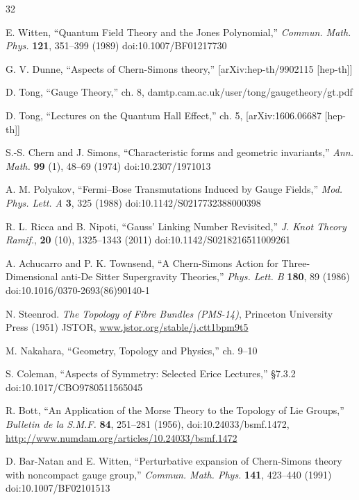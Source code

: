 \documentclass[11pt,a4paper]{article}
\begin{document}
\begin{thebibliography}{32}

 E. Witten, ``Quantum Field Theory and the Jones Polynomial,'' \emph{Commun. Math. Phys.} \textbf{121}, 351--399 (1989) doi:10.1007/BF01217730

 G. V. Dunne, ``Aspects of Chern-Simons theory,'' [arXiv:hep-th/9902115 [hep-th]]

 D. Tong, ``Gauge Theory,'' ch. 8, damtp.cam.ac.uk/user/tong/gaugetheory/gt.pdf

 D. Tong, ``Lectures on the Quantum Hall Effect,'' ch. 5, [arXiv:1606.06687 [hep-th]]

 S.-S. Chern and J. Simons, ``Characteristic forms and geometric invariants,'' \emph{Ann. Math.} \textbf{99} (1), 48--69 (1974) doi:10.2307/1971013

 A. M. Polyakov, ``Fermi--Bose Transmutations Induced by Gauge Fields,'' \emph{Mod. Phys. Lett. A} \textbf{3}, 325 (1988) doi:10.1142/S0217732388000398

 R. L. Ricca and B. Nipoti, ``Gauss' Linking Number Revisited,'' \emph{J. Knot Theory Ramif.}, \textbf{20} (10), 1325--1343 (2011) doi:10.1142/S0218216511009261

 A. Achucarro and P. K. Townsend, ``A Chern-Simons Action for Three-Dimensional anti-De Sitter Supergravity Theories,'' \emph{Phys. Lett. B} \textbf{180}, 89 (1986) doi:10.1016/0370-2693(86)90140-1

 N. Steenrod. \emph{The Topology of Fibre Bundles (PMS-14)}, Princeton University Press (1951) JSTOR, \href{https://www.jstor.org/stable/j.ctt1bpm9t5}{www.jstor.org/stable/j.ctt1bpm9t5}

 M. Nakahara, ``Geometry, Topology and Physics,'' ch. 9--10

 S. Coleman, ``Aspects of Symmetry: Selected Erice Lectures,'' \S7.3.2 doi:10.1017/CBO9780511565045

 R. Bott, ``An Application of the Morse Theory to the Topology of Lie Groups,'' \emph{Bulletin de la S.M.F.} \textbf{84}, 251--281 (1956), doi:10.24033/bsmf.1472, \href{http://www.numdam.org/articles/10.24033/bsmf.1472}{http://www.numdam.org/articles/10.24033/bsmf.1472}

 D. Bar-Natan and E. Witten, ``Perturbative expansion of Chern-Simons theory with noncompact gauge group,'' \emph{Commun. Math. Phys.} \textbf{141}, 423--440 (1991) doi:10.1007/BF02101513


\end{thebibliography}
\end{document}
